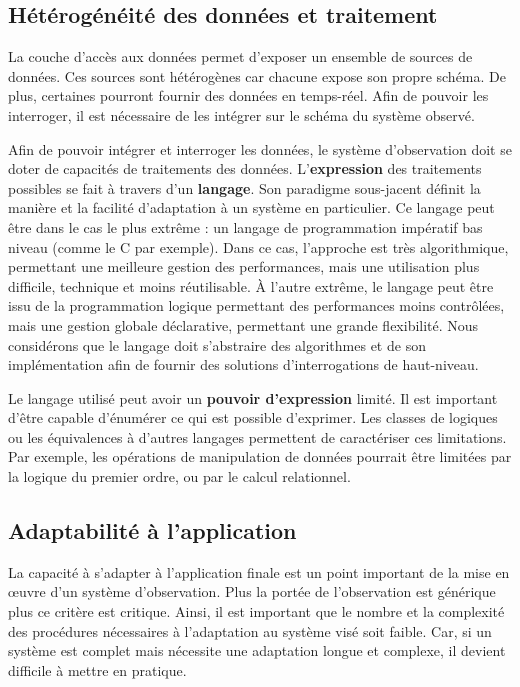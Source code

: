 \subsection{Hétérogénéité des données et traitement}
La couche d'accès aux données permet d'exposer un ensemble de sources de données. Ces sources sont hétérogènes car chacune expose son propre schéma. De plus, certaines pourront fournir des données en temps-réel. Afin de pouvoir les interroger, il est nécessaire de les intégrer sur le schéma du système observé.

Afin de pouvoir intégrer et interroger les données, le système d'observation doit se doter de capacités de traitements des données. L'\textbf{expression} des traitements possibles se fait à travers d'un \textbf{langage}. Son paradigme sous-jacent définit la manière et la facilité d'adaptation à un système en particulier. Ce langage peut être dans le cas le plus extrême : un langage de programmation impératif bas niveau (comme le C par exemple). Dans ce cas, l'approche est très algorithmique, permettant une meilleure gestion des performances, mais une utilisation plus difficile, technique et moins réutilisable. À l'autre extrême, le langage peut être issu de la programmation logique permettant des performances moins contrôlées, mais une gestion globale déclarative, permettant une grande flexibilité. Nous considérons que le langage doit s'abstraire des algorithmes et de son implémentation afin de fournir des solutions d'interrogations de haut-niveau.

Le langage utilisé peut avoir un \textbf{pouvoir d'expression} limité. Il est important d'être capable d'énumérer ce qui est possible d'exprimer. Les classes de logiques ou les équivalences à d'autres langages permettent de caractériser ces limitations. Par exemple, les opérations de manipulation de données pourrait être limitées par la logique du premier ordre, ou par le calcul relationnel.

\subsection{Adaptabilité à l'application}
La capacité à s'adapter à l'application finale est un point important de la mise en œuvre d'un système d'observation. Plus la portée de l'observation est générique plus ce critère est critique. Ainsi, il est important que le nombre et la complexité des procédures nécessaires à l'adaptation au système visé soit faible. Car, si un système est complet mais nécessite une adaptation longue et complexe, il devient difficile à mettre en pratique.


